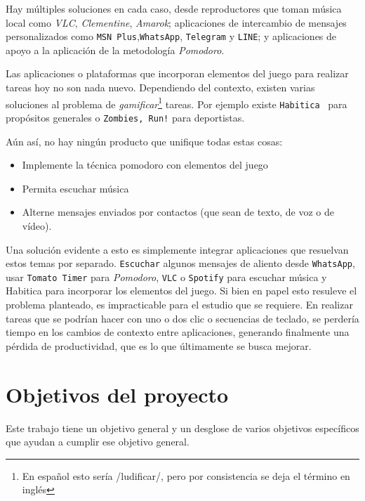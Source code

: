 \documentclass[12pt,letterpaper]{report}
\providecommand{\tightlist}{%
  \setlength{\itemsep}{0pt}\setlength{\parskip}{0pt}}
\begin{document}
Hay múltiples soluciones en cada caso,
%
desde reproductores que toman música local como \emph{VLC},
\emph{Clementine}, \emph{Amarok}; 
%
aplicaciones de intercambio de mensajes personalizados como \texttt{MSN Plus},\texttt{WhatsApp},
\texttt{Telegram} y \texttt{LINE}; y
%
aplicaciones de apoyo a la aplicación de la metodología \emph{Pomodoro}. 

Las aplicaciones o plataformas que incorporan elementos del juego para realizar
tareas hoy no son nada nuevo. Dependiendo del contexto, existen varias
soluciones al problema de \emph{gamificar}\footnote{En español esto sería
/ludificar/, pero por consistencia se deja el término en inglés} tareas. Por
ejemplo existe \texttt{Habitica}~\cite{habitica} para propósitos generales o
\texttt{Zombies, Run!} para deportistas.

Aún así, no hay ningún producto que unifique todas estas cosas:

\begin{itemize}
\tightlist
\item
  Implemente la técnica pomodoro con elementos del juego
\item
  Permita escuchar música
\item
  Alterne mensajes  enviados por contactos (que sean de texto, de voz o de vídeo).
\end{itemize}

Una solución evidente a esto es simplemente integrar aplicaciones que resuelvan
estos temas por separado. \texttt{Escuchar} algunos mensajes de aliento desde
\texttt{WhatsApp}, usar \texttt{Tomato Timer} para \emph{Pomodoro},
\texttt{VLC} o \texttt{Spotify} para escuchar música y Habitica para incorporar
los elementos del juego. Si bien en papel esto resuleve el problema planteado,
es impracticable para el estudio que se requiere. En realizar tareas que se
podrían hacer con uno o dos clic o secuencias de teclado, se perdería tiempo en
los cambios de contexto entre aplicaciones, generando finalmente una pérdida de
productividad, que es lo que últimamente se busca mejorar.

\newpage
\hypertarget{objetivos-del-proyecto}{%
\section{Objetivos del proyecto}\label{objetivos-del-proyecto}}

Este trabajo tiene un objetivo general y un desglose de varios objetivos
específicos que ayudan a cumplir ese objetivo general.
\end{document}
